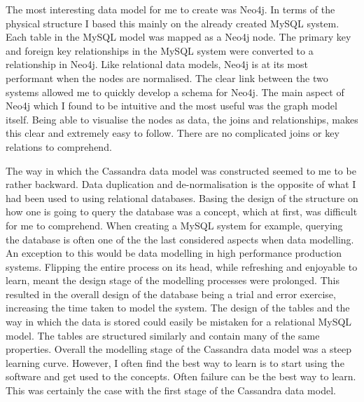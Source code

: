 The most interesting data model for me to create was Neo4j. In terms of the physical structure I based this mainly on the already created MySQL system. Each table in the MySQL model was mapped as a Neo4j node. The primary key and foreign key relationships in the MySQL system were converted to a relationship in Neo4j. Like relational data models, Neo4j is at its most performant when the nodes are normalised. The clear link between the two systems allowed me to quickly develop a schema for Neo4j. The main aspect of Neo4j which I found to be intuitive and the most useful was the graph model itself. Being able to visualise the nodes as data, the joins and relationships, makes this clear and extremely easy to follow. There are no complicated joins or key relations to comprehend.

The way in which the Cassandra data model was constructed seemed to me to be rather backward. Data duplication and de-normalisation is the opposite of what I had been used to using relational databases. Basing the design of the structure on how one is going to query the database was a concept, which at first, was difficult for me to comprehend. When creating a MySQL system for example, querying the database is often one of the the last considered aspects when data modelling. An exception to this would be data modelling in high performance production systems. Flipping the entire process on its head, while refreshing and enjoyable to learn, meant the design stage of the modelling processes were prolonged. This resulted in the overall design of the database being a trial and error exercise, increasing the time taken to model the system. The design of the tables and the way in which the data is stored could easily be mistaken for a relational MySQL model. The tables are structured similarly and contain many of the same properties. Overall the modelling stage of the Cassandra data model was a steep learning curve. However, I often find the best way to learn is to start using the software and get used to the concepts. Often failure can be the best way to learn. This was certainly the case with the first stage of the Cassandra data model.